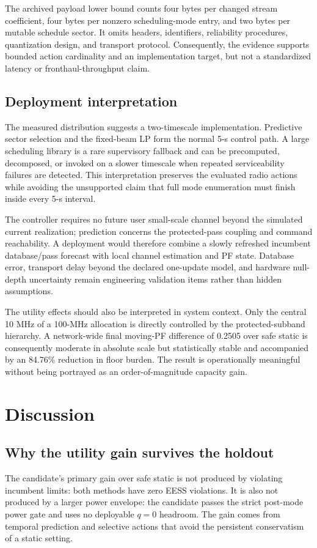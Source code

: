 \documentclass[journal]{IEEEtran}
\begin{document}
The archived payload lower bound counts four bytes per changed stream coefficient, four bytes per nonzero scheduling-mode entry, and two bytes per mutable schedule sector. It omits headers, identifiers, reliability procedures, quantization design, and transport protocol. Consequently, the evidence supports bounded action cardinality and an implementation target, but not a standardized latency or fronthaul-throughput claim.

\subsection{Deployment interpretation}
The measured distribution suggests a two-timescale implementation. Predictive sector selection and the fixed-beam LP form the normal 5-s control path. A large scheduling library is a rare supervisory fallback and can be precomputed, decomposed, or invoked on a slower timescale when repeated serviceability failures are detected. This interpretation preserves the evaluated radio actions while avoiding the unsupported claim that full mode enumeration must finish inside every 5-s interval.

The controller requires no future user small-scale channel beyond the simulated current realization; prediction concerns the protected-pass coupling and command reachability. A deployment would therefore combine a slowly refreshed incumbent database/pass forecast with local channel estimation and PF state. Database error, transport delay beyond the declared one-update model, and hardware null-depth uncertainty remain engineering validation items rather than hidden assumptions.

The utility effects should also be interpreted in system context. Only the central 10 MHz of a 100-MHz allocation is directly controlled by the protected-subband hierarchy. A network-wide final moving-PF difference of 0.2505 over safe static is consequently moderate in absolute scale but statistically stable and accompanied by an 84.76\% reduction in floor burden. The result is operationally meaningful without being portrayed as an order-of-magnitude capacity gain.

\section{Discussion}
\subsection{Why the utility gain survives the holdout}
The candidate's primary gain over safe static is not produced by violating incumbent limits: both methods have zero EESS violations. It is also not produced by a larger power envelope: the candidate passes the strict post-mode power gate and uses no deployable $q=0$ headroom. The gain comes from temporal prediction and selective actions that avoid the persistent conservatism of a static setting.
\end{document}
